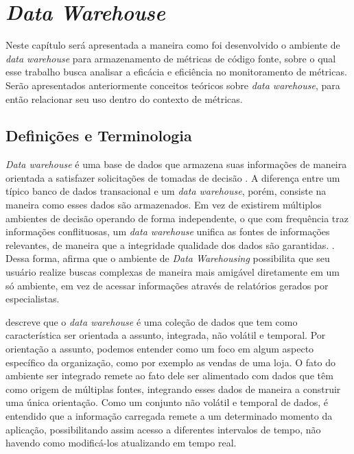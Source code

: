 \chapter{\textit{Data Warehouse}} 
\label{chap:arquitetura}

Neste capítulo será apresentada a maneira como foi desenvolvido o ambiente de \textit{data warehouse} para armazenamento de métricas de código fonte, sobre o qual esse trabalho busca analisar a eficácia e eficiência no monitoramento de métricas. Serão apresentados anteriormente conceitos teóricos sobre \textit{data warehouse}, para então relacionar seu uso dentro do contexto de métricas. 

\section{Definições e Terminologia}

\textit{Data warehouse} é uma base de dados que armazena suas informações de maneira orientada a satisfazer solicitações de tomadas de decisão \cite{chaudhuri1997}. A diferença entre um típico banco de dados transacional e um  \textit{data warehouse}, porém, consiste na maneira como esses dados são armazenados. Em vez de existirem múltiplos ambientes de decisão operando de forma independente, o que com frequência traz informações conflituosas, um \textit{data warehouse} unifica as fontes de informações relevantes, de maneira que a integridade  qualidade dos dados são garantidas. \cite{neeraj_sharma_2011}. Dessa forma,  afirma que o ambiente de \textit{Data Warehousing} possibilita que seu usuário realize buscas complexas de maneira mais amigável diretamente em um só ambiente, em vez de acessar informações através de relatórios gerados por especialistas. 

 descreve que o \textit{data warehouse} é uma coleção de dados que tem como característica ser orientada a assunto, integrada, não volátil e temporal. Por orientação a assunto, podemos entender como um foco em algum aspecto específico da organização, como por exemplo as vendas de uma loja. O fato do ambiente ser integrado remete ao fato dele ser alimentado com dados que têm como origem de múltiplas fontes, integrando esses dados de maneira a construir uma única orientação. Como um conjunto não volátil e temporal de dados, é entendido que a informação carregada remete a um determinado momento da aplicação, possibilitando assim acesso a diferentes intervalos de tempo, não havendo como modificá-los atualizando em tempo real. 

